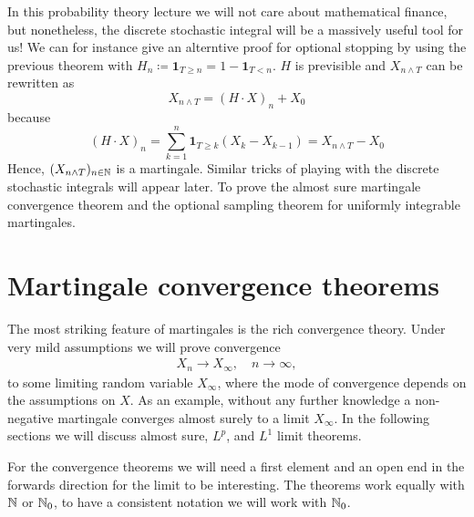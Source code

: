In this probability theory lecture we will not care about mathematical finance, but nonetheless, the discrete stochastic integral will be a massively useful tool for us! We can for instance give an alterntive proof for optional stopping by using the previous theorem with $H_n \coloneqq \mathbf 1_{T\geq n} = 1 - \mathbf 1_{T<n}$. $H$ is previsible and $X_{n\wedge T}$ can be rewritten as
$$ X_{n\wedge T} = (H\cdot X)_n + X_0$$ because $$ (H\cdot X)_n = \sum\limits_{k=1}^{n}\mathbf 1_{T\geq k}(X_k - X_{k-1}) = X_{n\wedge T} - X_0 $$
Hence, $(X_{n\wedge T})_{n\in\mathbb{N}}$ is a martingale. Similar tricks of playing with the discrete stochastic integrals will appear later. To prove the almost sure martingale convergence theorem and the optional sampling theorem for uniformly integrable martingales.

\section{Martingale convergence theorems}\label{mlimits}
The most striking feature of martingales is the rich convergence theory. Under very mild assumptions we will prove convergence
\begin{align*}
	X_n\to X_\infty,\quad n\to\infty,
\end{align*}
to some limiting random variable $X_\infty$, where the mode of convergence depends on the assumptions on $X$. As an example, without any further knowledge a non-negative martingale converges almost surely to a limit $X_\infty$. In the following sections we will discuss almost sure, $L^p$, and $L^1$ limit theorems.\smallskip

For the convergence theorems we will need a first element and an open end in the forwards direction for the limit to be interesting. The theorems work equally with $\mathbb{N}$ or $\mathbb{N}_0$, to have a consistent notation we will work with $\mathbb{N}_0$.



